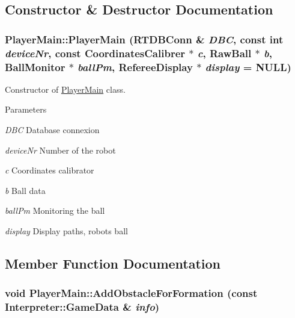 \subsection{Constructor \& Destructor Documentation}
\hypertarget{classPlayerMain_a12957aeecc6902370f03ff2ffbb0551d}{
\subsubsection[{PlayerMain}]{\setlength{\rightskip}{0pt plus 5cm}PlayerMain::PlayerMain (RTDBConn \& {\em DBC}, \/  const int {\em deviceNr}, \/  const {\bf CoordinatesCalibrer} $\ast$ {\em c}, \/  RawBall $\ast$ {\em b}, \/  {\bf BallMonitor} $\ast$ {\em ballPm}, \/  {\bf RefereeDisplay} $\ast$ {\em display} = {\ttfamily NULL})}}
\label{classPlayerMain_a12957aeecc6902370f03ff2ffbb0551d}


Constructor of \hyperlink{classPlayerMain}{PlayerMain} class. 


\begin{DoxyParams}{Parameters}
\item[{\em DBC}]Database connexion \item[{\em deviceNr}]Number of the robot \item[{\em c}]Coordinates calibrator \item[{\em b}]Ball data \item[{\em ballPm}]Monitoring the ball \item[{\em display}]Display paths, robots ball \end{DoxyParams}


\subsection{Member Function Documentation}
\hypertarget{classPlayerMain_a978b3ce16f5d8e5d1cb9ef70f387227e}{
\subsubsection[{AddObstacleForFormation}]{\setlength{\rightskip}{0pt plus 5cm}void PlayerMain::AddObstacleForFormation (const {\bf Interpreter::GameData} \& {\em info})}}
\label{classPlayerMain_a978b3ce16f5d8e5d1cb9ef70f387227e}


